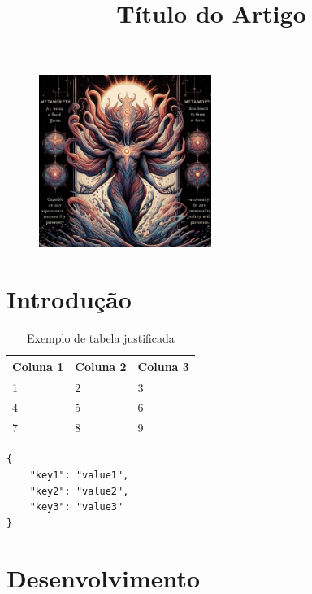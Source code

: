 \documentclass{article}
\title{\bfseries\fontsize{16}{16}\selectfont Título do Artigo}
\author{}
\date{}
\begin{document}
\begin{figure}[h]
    \centering
    \includegraphics[width=0.5\textwidth]{./images/Metamorph_All.jpeg}
    \maketitle
\end{figure}
\newpage

\renewcommand{\contentsname}{Sumário}
\tableofcontents
\newpage

\section{Introdução}
\lipsum[1]

\begin{table}[h]
    \centering
    \begin{tabular}{|p{5cm}|p{5cm}|p{5cm}|}
        \hline
        Coluna 1 & Coluna 2 & Coluna 3 \\
        \hline
        1 & 2 & 3 \\
        \hline
        4 & 5 & 6 \\
        \hline
        7 & 8 & 9 \\
        \hline
    \end{tabular}
    \caption{Exemplo de tabela justificada}
\end{table}

\begin{tcolorbox}
\begin{verbatim}
{
    "key1": "value1",
    "key2": "value2",
    "key3": "value3"
}
\end{verbatim}
\end{tcolorbox}

\section{Desenvolvimento}
\lipsum[2]
\end{document}
